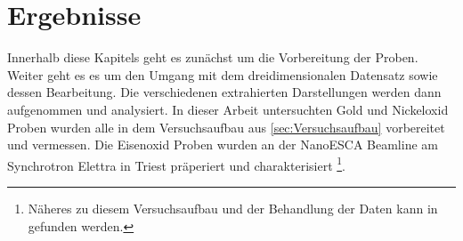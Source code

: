 \chapter{Ergebnisse}
    Innerhalb diese Kapitels geht es zunächst um die Vorbereitung der Proben.
    Weiter geht es es um den Umgang mit dem dreidimensionalen Datensatz sowie dessen Bearbeitung.
    Die verschiedenen extrahierten Darstellungen werden dann aufgenommen und analysiert.
    In dieser Arbeit untersuchten Gold und Nickeloxid Proben wurden alle in dem Versuchsaufbau aus \autoref{sec:Versuchsaufbau} vorbereitet und vermessen.
    Die Eisenoxid Proben wurden an der NanoESCA Beamline am Synchrotron Elettra in Triest präperiert und charakterisiert \footnote{Näheres zu diesem Versuchsaufbau und der Behandlung der Daten kann in \cite{ma-DJ} gefunden werden.}.

